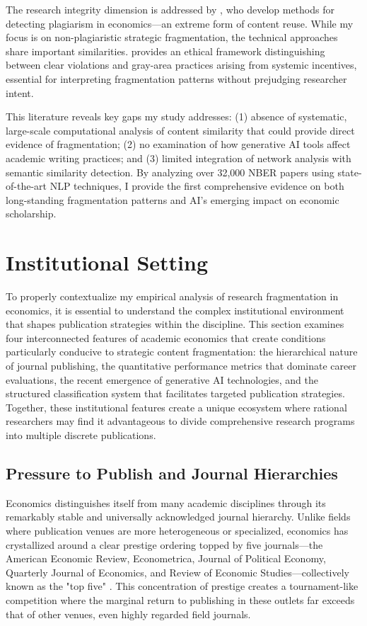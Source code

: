 \documentclass[12pt]{article}
\begin{document}
The research integrity dimension is addressed by \citet{zhang2022plagiarism}, who develop methods for detecting plagiarism in economics—an extreme form of content reuse. While my focus is on non-plagiaristic strategic fragmentation, the technical approaches share important similarities. \citet{bornmann2012standards} provides an ethical framework distinguishing between clear violations and gray-area practices arising from systemic incentives, essential for interpreting fragmentation patterns without prejudging researcher intent.

This literature reveals key gaps my study addresses: (1) absence of systematic, large-scale computational analysis of content similarity that could provide direct evidence of fragmentation; (2) no examination of how generative AI tools affect academic writing practices; and (3) limited integration of network analysis with semantic similarity detection. By analyzing over 32,000 NBER papers using state-of-the-art NLP techniques, I provide the first comprehensive evidence on both long-standing fragmentation patterns and AI's emerging impact on economic scholarship.

\section{Institutional Setting}
\label{sec:institutional}

To properly contextualize my empirical analysis of research fragmentation in economics, it is essential to understand the complex institutional environment that shapes publication strategies within the discipline. This section examines four interconnected features of academic economics that create conditions particularly conducive to strategic content fragmentation: the hierarchical nature of journal publishing, the quantitative performance metrics that dominate career evaluations, the recent emergence of generative AI technologies, and the structured classification system that facilitates targeted publication strategies. Together, these institutional features create a unique ecosystem where rational researchers may find it advantageous to divide comprehensive research programs into multiple discrete publications.

\subsection{Pressure to Publish and Journal Hierarchies}

Economics distinguishes itself from many academic disciplines through its remarkably stable and universally acknowledged journal hierarchy. Unlike fields where publication venues are more heterogeneous or specialized, economics has crystallized around a clear prestige ordering topped by five journals—the American Economic Review, Econometrica, Journal of Political Economy, Quarterly Journal of Economics, and Review of Economic Studies—collectively known as the "top five" \citep{heckman2020publishing, card2013female}. This concentration of prestige creates a tournament-like competition where the marginal return to publishing in these outlets far exceeds that of other venues, even highly regarded field journals.
\end{document}
